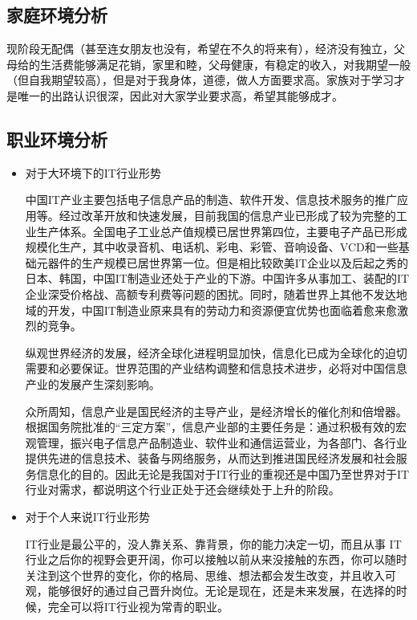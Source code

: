 \documentclass{article}
\begin{document}
\subsection{家庭环境分析}
现阶段无配偶（甚至连女朋友也没有，希望在不久的将来有），经济没有独立，父母给的生活费能够满足花销，家里和睦，父母健康，有稳定的收入，对我期望一般（但自我期望较高），但是对于我身体，道德，做人方面要求高。家族对于学习才是唯一的出路认识很深，因此对大家学业要求高，希望其能够成才。\par
\subsection{职业环境分析}
\begin{itemize}
    \item 对于大环境下的IT行业形势\par
中国IT产业主要包括电子信息产品的制造、软件开发、信息技术服务的推广应用等。经过改革开放和快速发展，目前我国的信息产业已形成了较为完整的工业生产体系。全国电子工业总产值规模已居世界第四位，主要电子产品已形成规模化生产，其中收录音机、电话机、彩电、彩管、音响设备、VCD和一些基础元器件的生产规模已居世界第一位。但是相比较欧美IT企业以及后起之秀的日本、韩国，中国IT制造业还处于产业的下游。中国许多从事加工、装配的IT企业深受价格战、高额专利费等问题的困扰。同时，随着世界上其他不发达地域的开发，中国IT制造业原来具有的劳动力和资源便宜优势也面临着愈来愈激烈的竞争。\par 纵观世界经济的发展，经济全球化进程明显加快，信息化已成为全球化的迫切需要和必要保证。世界范围的产业结构调整和信息技术进步，必将对中国信息产业的发展产生深刻影响。\par
众所周知，信息产业是国民经济的主导产业，是经济增长的催化剂和倍增器。根据国务院批准的“三定方案”，信息产业部的主要任务是：通过积极有效的宏观管理，振兴电子信息产品制造业、软件业和通信运营业，为各部门、各行业提供先进的信息技术、装备与网络服务，从而达到推进国民经济发展和社会服务信息化的目的。因此无论是我国对于IT行业的重视还是中国乃至世界对于IT行业对需求，都说明这个行业正处于还会继续处于上升的阶段。
\item 对于个人来说IT行业形势 \par IT行业是最公平的，没人靠关系、靠背景，你的能力决定一切，而且从事 IT 行业之后你的视野会更开阔，你可以接触以前从来没接触的东西，你可以随时关注到这个世界的变化，你的格局、思维、想法都会发生改变，并且收入可观，能够很好的通过自己晋升岗位。无论是现在，还是未来发展，在选择的时候，完全可以将IT行业视为常青的职业。
\par
\end{itemize}
\end{document}
